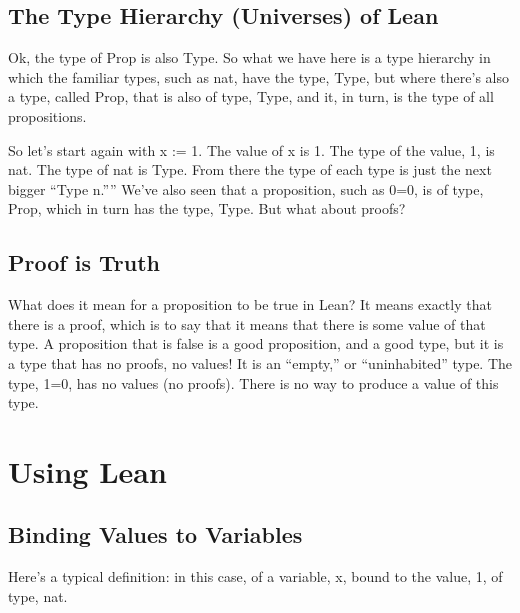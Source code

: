 \documentclass[letterpaper,10pt,english]{sphinxmanual}
\begin{document}
\begin{sphinxVerbatim}[commandchars=\\\{\}]
 
\end{sphinxVerbatim}


\subsection{The Type Hierarchy (Universes) of Lean}
\label{\detokenize{15-proofs:the-type-hierarchy-universes-of-lean}}
Ok, the type of Prop is also Type. So what we have here is a type
hierarchy in which the familiar types, such as nat, have the type,
Type, but where there’s also a type, called Prop, that is also of
type, Type, and it, in turn, is the type of all propositions.

So let’s start again with x := 1. The value of x is 1. The type of the
value, 1, is nat.  The type of nat is Type. From there the type of
each type is just the next bigger “Type n.””  We’ve also seen that a
proposition, such as 0=0, is of type, Prop, which in turn has the
type, Type. But what about proofs?


\subsection{Proof is Truth}
\label{\detokenize{15-proofs:proof-is-truth}}
What does it mean for a proposition to be true in Lean? It means
exactly that there is a proof, which is to say that it means that
there is some value of that type. A proposition that is false is a
good proposition, and a good type, but it is a type that has no
proofs, no values! It is an “empty,” or “uninhabited” type. The type,
1=0, has no values (no proofs). There is no way to produce a value of
this type.


\section{Using Lean}
\label{\detokenize{15-proofs:using-lean}}

\subsection{Binding Values to Variables}
\label{\detokenize{15-proofs:binding-values-to-variables}}
Here’s a typical definition: in this case, of a variable, x, bound to
the value, 1, of type, nat.

\begin{sphinxVerbatim}[commandchars=\\\{\}]
    
    
   
\end{sphinxVerbatim}
\end{document}
